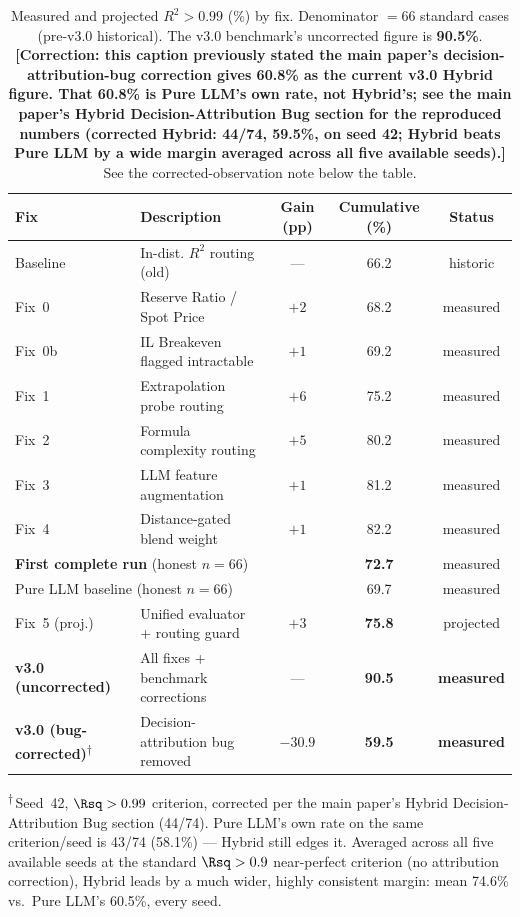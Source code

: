 \documentclass[twoside,11pt]{article}
\begin{document}
\begin{table}[h]
\centering
\caption{Measured and projected $R^2 > 0.99$ (\%) by fix.
         Denominator $= 66$ standard cases (pre-v3.0 historical). The
         v3.0 benchmark's uncorrected figure is \textbf{90.5\%}.
         \textbf{[Correction: this caption previously stated the main
         paper's decision-attribution-bug correction gives 60.8\% as
         the current v3.0 Hybrid figure. That 60.8\% is Pure LLM's own
         rate, not Hybrid's; see the main paper's Hybrid
         Decision-Attribution Bug section for the reproduced numbers
         (corrected Hybrid: 44/74, 59.5\%, on seed 42; Hybrid beats
         Pure LLM by a wide margin averaged across all five available
         seeds).]} See the corrected-observation note below the table.}
\label{tab:projected}
\begin{tabular}{llccc}
\toprule
\textbf{Fix} & \textbf{Description} & \textbf{Gain (pp)} & \textbf{Cumulative (\%)} & \textbf{Status} \\
\midrule
Baseline    & In-dist. $R^2$ routing (old)      & ---  & 66.2 & historic  \\
Fix~0       & Reserve Ratio / Spot Price        & $+2$ & 68.2 & measured  \\
Fix~0b      & IL Breakeven flagged intractable  & $+1$ & 69.2 & measured  \\
Fix~1       & Extrapolation probe routing       & $+6$ & 75.2 & measured  \\
Fix~2       & Formula complexity routing        & $+5$ & 80.2 & measured  \\
Fix~3       & LLM feature augmentation          & $+1$ & 81.2 & measured  \\
Fix~4       & Distance-gated blend weight       & $+1$ & 82.2 & measured  \\
\midrule
\multicolumn{2}{l}{\textbf{First complete run} (honest $n{=}66$)} & & \textbf{72.7} & measured \\
\multicolumn{2}{l}{Pure LLM baseline (honest $n{=}66$)}           & & 69.7          & measured \\
\midrule
Fix~5 (proj.) & Unified evaluator + routing guard & $+3$ & \textbf{75.8} & projected \\
\midrule
\textbf{v3.0 (uncorrected)} & All fixes + benchmark corrections & --- & \textbf{90.5} & \textbf{measured} \\
\textbf{v3.0 (bug-corrected)}\textsuperscript{$\dagger$} & Decision-attribution bug removed & $-30.9$ & \textbf{59.5} & \textbf{measured} \\
\bottomrule
\end{tabular}
\begin{flushleft}
\footnotesize\textsuperscript{$\dagger$}\,Seed~42, $\Rsq>0.99$ criterion, corrected per the main paper's
Hybrid Decision-Attribution Bug section (44/74). Pure LLM's own rate on
the same criterion/seed is 43/74 (58.1\%) --- Hybrid still edges it.
Averaged across all five available seeds at the standard $\Rsq>0.9$
near-perfect criterion (no attribution correction), Hybrid leads by a
much wider, highly consistent margin: mean 74.6\% vs.\ Pure LLM's
60.5\%, every seed.
\end{flushleft}
\end{table}
\end{document}
